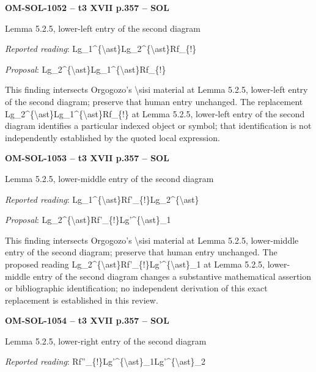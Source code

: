 \par\noindent\textbf{OM-SOL-1052 -- t3 XVII p.357 -- SOL}\par
Lemma 5.2.5, lower-left entry of the second diagram\par
\emph{Reported reading}: Lg\_1\textasciicircum{}\{\textbackslash{}ast\}Lg\_2\textasciicircum{}\{\textbackslash{}ast\}Rf\_\{!\}\par
\emph{Proposal}: Lg\_2\textasciicircum{}\{\textbackslash{}ast\}Lg\_1\textasciicircum{}\{\textbackslash{}ast\}Rf\_\{!\}\par
This finding intersects Orgogozo's \textbackslash{}sisi material at Lemma 5.2.5, lower-left entry of the second diagram; preserve that human entry unchanged. The replacement Lg\_2\textasciicircum{}\{\textbackslash{}ast\}Lg\_1\textasciicircum{}\{\textbackslash{}ast\}Rf\_\{!\} at Lemma 5.2.5, lower-left entry of the second diagram identifies a particular indexed object or symbol; that identification is not independently established by the quoted local expression.\par
\par\noindent\textbf{OM-SOL-1053 -- t3 XVII p.357 -- SOL}\par
Lemma 5.2.5, lower-middle entry of the second diagram\par
\emph{Reported reading}: Lg\_1\textasciicircum{}\{\textbackslash{}ast\}Rf'\_\{!\}Lg\_2\textasciicircum{}\{\textbackslash{}ast\}\par
\emph{Proposal}: Lg\_2\textasciicircum{}\{\textbackslash{}ast\}Rf'\_\{!\}Lg'\textasciicircum{}\{\textbackslash{}ast\}\_1\par
This finding intersects Orgogozo's \textbackslash{}sisi material at Lemma 5.2.5, lower-middle entry of the second diagram; preserve that human entry unchanged. The proposed reading Lg\_2\textasciicircum{}\{\textbackslash{}ast\}Rf'\_\{!\}Lg'\textasciicircum{}\{\textbackslash{}ast\}\_1 at Lemma 5.2.5, lower-middle entry of the second diagram changes a substantive mathematical assertion or bibliographic identification; no independent derivation of this exact replacement is established in this review.\par
\par\noindent\textbf{OM-SOL-1054 -- t3 XVII p.357 -- SOL}\par
Lemma 5.2.5, lower-right entry of the second diagram\par
\emph{Reported reading}: Rf''\_\{!\}Lg'\textasciicircum{}\{\textbackslash{}ast\}\_1Lg'\textasciicircum{}\{\textbackslash{}ast\}\_2\par
